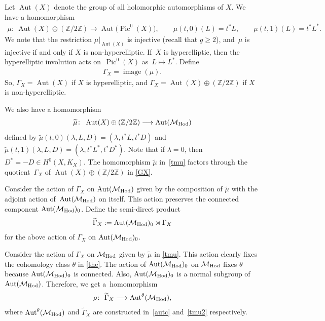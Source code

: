 \documentclass[pdftex]{sigma}
\numberwithin{equation}{section}
\begin{document}
Let $\operatorname{Aut}(X)$ denote the group of all holomorphic automorphisms of $X$. We have a
homomorphism
\begin{gather*}
\mu \colon \ \operatorname{Aut}(X)\oplus ({\mathbb Z}/2{\mathbb Z}) \longrightarrow
\operatorname{Aut}\big(\operatorname{Pic}^0(X)\big) , \qquad \mu(t,0)(L) = t^*L , \qquad \mu(t,1)(L) = t^*L^* .
\end{gather*}
We note that the restriction $\mu\vert_{\operatorname{Aut}(X)}$ is injective (recall that $g \geq 2$), and~$\mu$ is injective if and only if $X$ is non-hyperelliptic. If~$X$ is hyperelliptic, then the hyperelliptic involution acts on~$\operatorname{Pic}^0(X)$ as~$L \longmapsto L^*$. Def\/ine
\begin{gather}\label{GX}
\Gamma_X = \operatorname{image}(\mu) .
\end{gather}
So, $\Gamma_X = \operatorname{Aut}(X)$ if $X$ is hyperelliptic, and $\Gamma_X = \operatorname{Aut}(X)\oplus ({\mathbb Z}/2{\mathbb Z})$ if $X$ is non-hyperelliptic.

We also have a homomorphism
\begin{gather}\label{tmu}
\widetilde{\mu} \colon \  \operatorname{Aut}(X)\oplus ({\mathbb Z}/2{\mathbb Z}) \longrightarrow \operatorname{Aut}({\mathcal M}_{\rm Hod})
\end{gather}
def\/ined by $\widetilde{\mu}(t,0)(\lambda, L, D) = (\lambda, t^*L, t^*D)$ and $\widetilde{\mu}(t,1)(\lambda, L, D) = (\lambda, t^*L^*, t^*D^*)$. Note that if $\lambda = 0$, then $D^* = -D \in H^0(X, K_X)$. The homomorphism $\widetilde{\mu}$ in~\eqref{tmu} factors through the quotient~$\Gamma_X$ of $\operatorname{Aut}(X)\oplus ({\mathbb Z}/2{\mathbb Z})$ in \eqref{GX}.

Consider the action of $\Gamma_X$ on $\operatorname{Aut}({\mathcal M}_{\rm Hod})$ given by the composition of $\widetilde{\mu}$ with the adjoint action of~$\operatorname{Aut}({\mathcal M}_{\rm Hod})$ on itself. This action preserves the connected component $\operatorname{Aut}({\mathcal M}_{\rm Hod})_0$. Def\/ine the semi-direct product
\begin{gather}\label{tmu2}
\widetilde{\Gamma}_X := \operatorname{Aut}({\mathcal M}_{\rm Hod})_0\rtimes \Gamma_X
\end{gather}
for the above action of $\Gamma_X$ on $\operatorname{Aut}({\mathcal M}_{\rm Hod})_0$.

Consider the action of $\Gamma_X$ on ${\mathcal M}_{\rm Hod}$ given by $\widetilde{\mu}$ in \eqref{tmu}. This action clearly f\/ixes the cohomology class $\theta$ in \eqref{the}. The action of $\operatorname{Aut}({\mathcal M}_{\rm Hod})_0$ on ${\mathcal M}_{\rm Hod}$ f\/ixes $\theta$ because $\operatorname{Aut}({\mathcal M}_{\rm Hod})_0$ is connected. Also, $\operatorname{Aut}({\mathcal M}_{\rm Hod})_0$ is a normal subgroup of~$\operatorname{Aut}({\mathcal M}_{\rm Hod})$. Therefore, we get a~homomorphism
\begin{gather}\label{rho}
\rho \colon \ \widetilde{\Gamma}_X \longrightarrow \operatorname{Aut}^\theta({\mathcal M}_{\rm Hod}),
\end{gather}
where $\operatorname{Aut}^\theta({\mathcal M}_{\rm Hod})$ and $\widetilde{\Gamma}_X$ are constructed in~\eqref{autc} and~\eqref{tmu2} respectively.
\end{document}

